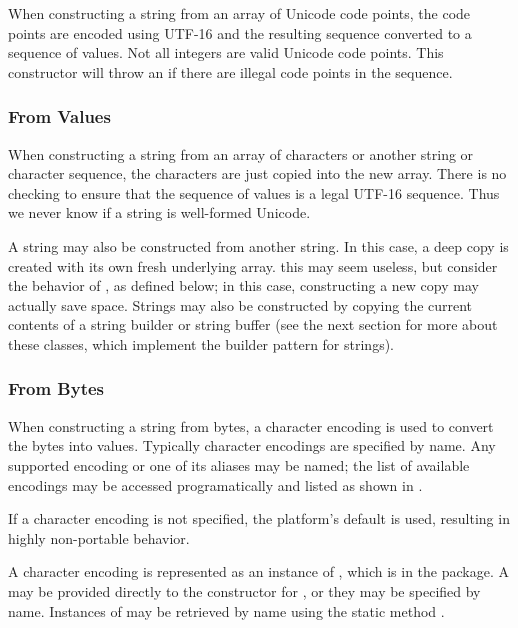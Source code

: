 When constructing a string from an array of Unicode code points, the
code points are encoded using UTF-16 and the resulting sequence
converted to a sequence of  values.  Not all integers are
valid Unicode code points.  This constructor will throw an
 if there are illegal code points in
the sequence.

\subsubsection{From  Values}

When constructing a string from an array of characters or another
string or character sequence, the characters are just copied into the
new array.  There is no checking to ensure that the sequence of
 values is a legal UTF-16 sequence.  Thus we never know if
a string is well-formed Unicode.

A string may also be constructed from another string.  In this case, a
deep copy is created with its own fresh underlying array.  this may
seem useless, but consider the behavior of , as
defined below; in this case, constructing a new copy may actually save
space.  Strings may also be constructed by copying the current
contents of a string builder or string buffer (see the next section
for more about these classes, which implement the builder pattern for
strings).

\subsubsection{From Bytes}

When constructing a string from bytes, a character encoding is used to
convert the bytes into  values.  Typically character
encodings are specified by name.  Any supported encoding or one of its
aliases may be named; the list of available encodings may be accessed
programatically and listed as shown in .

If a character encoding is not specified, the platform's default is
used, resulting in highly non-portable behavior.

A character encoding is represented as an instance of ,
which is in the  package.  A  may
be provided directly to the constructor for , or they may
be specified by name.  Instances of  may be retrieved by
name using the static method .

